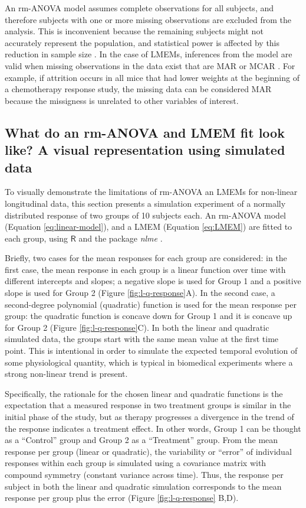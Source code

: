 \documentclass[Royal,times,doublespace,sagev]{sagej}
\begin{document}
An rm-ANOVA model assumes complete observations for all subjects, and therefore subjects with one or more missing observations are excluded from the analysis. This is inconvenient because the remaining subjects might not accurately represent the population, and statistical power is affected by this reduction in sample size \cite{ma2012}. In the case of LMEMs, inferences from the model are valid when missing observations in the data exist that are MAR or MCAR \cite{west2014}. For example, if attrition occurs in all mice that had lower weights at the beginning of a chemotherapy response study, the missing data can be considered MAR because the missigness is unrelated to other variables of interest.

\hypertarget{simulation}{%
\subsection{What do an rm-ANOVA and LMEM fit look like? A visual representation using simulated data}\label{simulation}}

To visually demonstrate the limitations of rm-ANOVA an LMEMs for non-linear longitudinal data, this section presents a simulation experiment of a normally distributed response of two groups of 10 subjects each. An rm-ANOVA model (Equation \eqref{eq:linear-model}), and a LMEM (Equation \eqref{eq:LMEM}) are fitted to each group, using \(\textsf{R}\) \cite{r} and the package \emph{nlme} \cite{nlme}.

Briefly, two cases for the mean responses for each group are considered: in the first case, the mean response in each group is a linear function over time with different intercepts and slopes; a negative slope is used for Group 1 and a positive slope is used for Group 2 (Figure \ref{fig:l-q-response}A). In the second case, a second-degree polynomial (quadratic) function is used for the mean response per group: the quadratic function is concave down for Group 1 and it is concave up for Group 2 (Figure \ref{fig:l-q-response}C). In both the linear and quadratic simulated data, the groups start with the same mean value at the first time point. This is intentional in order to simulate the expected temporal evolution of some physiological quantity, which is typical in biomedical experiments where a strong non-linear trend is present.

Specifically, the rationale for the chosen linear and quadratic functions is the expectation that a measured response in two treatment groups is similar in the initial phase of the study, but as therapy progresses a divergence in the trend of the response indicates a treatment effect. In other words, Group 1 can be thought as a ``Control'' group and Group 2 as a ``Treatment'' group. From the mean response per group (linear or quadratic), the variability or ``error'' of individual responses within each group is simulated using a covariance matrix with compound symmetry (constant variance across time). Thus, the response per subject in both the linear and quadratic simulation corresponds to the mean response per group plus the error (Figure \ref{fig:l-q-response} B,D).
\end{document}
